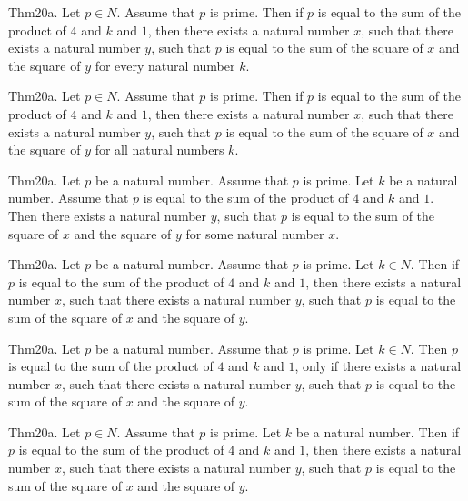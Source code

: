 \documentclass{article}
\begin{document}
Thm20a. Let $p \in N$. Assume that $p$ is prime. Then if $p$ is equal to the sum of the product of $4$ and $k$ and $1$, then there exists a natural number $x$, such that there exists a natural number $y$, such that $p$ is equal to the sum of the square of $x$ and the square of $y$ for every natural number $k$.

Thm20a. Let $p \in N$. Assume that $p$ is prime. Then if $p$ is equal to the sum of the product of $4$ and $k$ and $1$, then there exists a natural number $x$, such that there exists a natural number $y$, such that $p$ is equal to the sum of the square of $x$ and the square of $y$ for all natural numbers $k$.

Thm20a. Let $p$ be a natural number. Assume that $p$ is prime. Let $k$ be a natural number. Assume that $p$ is equal to the sum of the product of $4$ and $k$ and $1$. Then there exists a natural number $y$, such that $p$ is equal to the sum of the square of $x$ and the square of $y$ for some natural number $x$.

Thm20a. Let $p$ be a natural number. Assume that $p$ is prime. Let $k \in N$. Then if $p$ is equal to the sum of the product of $4$ and $k$ and $1$, then there exists a natural number $x$, such that there exists a natural number $y$, such that $p$ is equal to the sum of the square of $x$ and the square of $y$.

Thm20a. Let $p$ be a natural number. Assume that $p$ is prime. Let $k \in N$. Then $p$ is equal to the sum of the product of $4$ and $k$ and $1$, only if there exists a natural number $x$, such that there exists a natural number $y$, such that $p$ is equal to the sum of the square of $x$ and the square of $y$.

Thm20a. Let $p \in N$. Assume that $p$ is prime. Let $k$ be a natural number. Then if $p$ is equal to the sum of the product of $4$ and $k$ and $1$, then there exists a natural number $x$, such that there exists a natural number $y$, such that $p$ is equal to the sum of the square of $x$ and the square of $y$.
\end{document}

